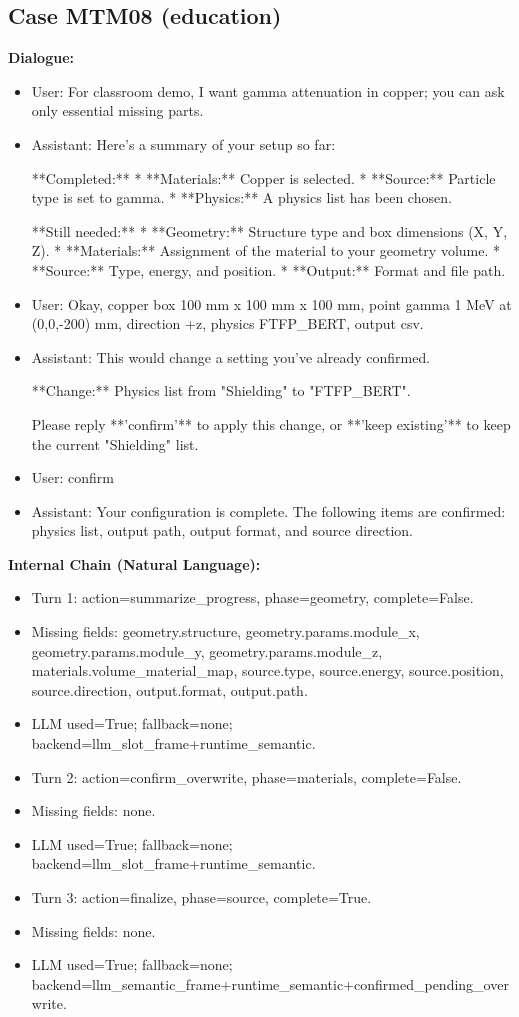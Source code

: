 \documentclass[11pt]{ctexart}
\begin{document}
\subsection{Case MTM08 (education)}
\textbf{Dialogue:}
\begin{itemize}
\item User: For classroom demo, I want gamma attenuation in copper; you can ask only essential missing parts.
\item Assistant: Here's a summary of your setup so far:

**Completed:**
*   **Materials:** Copper is selected.
*   **Source:** Particle type is set to gamma.
*   **Physics:** A physics list has been chosen.

**Still needed:**
*   **Geometry:** Structure type and box dimensions (X, Y, Z).
*   **Materials:** Assignment of the material to your geometry volume.
*   **Source:** Type, energy, and position.
*   **Output:** Format and file path.
\item User: Okay, copper box 100 mm x 100 mm x 100 mm, point gamma 1 MeV at (0,0,-200) mm, direction +z, physics FTFP\_BERT, output csv.
\item Assistant: This would change a setting you've already confirmed.

**Change:** Physics list from "Shielding" to "FTFP\_BERT".

Please reply **'confirm'** to apply this change, or **'keep existing'** to keep the current "Shielding" list.
\item User: confirm
\item Assistant: Your configuration is complete. The following items are confirmed: physics list, output path, output format, and source direction.
\end{itemize}
\textbf{Internal Chain (Natural Language):}
\begin{itemize}
\item Turn 1: action=summarize\_progress, phase=geometry, complete=False.
\item Missing fields: geometry.structure, geometry.params.module\_x, geometry.params.module\_y, geometry.params.module\_z, materials.volume\_material\_map, source.type, source.energy, source.position, source.direction, output.format, output.path.
\item LLM used=True; fallback=none; backend=llm\_slot\_frame+runtime\_semantic.
\item Turn 2: action=confirm\_overwrite, phase=materials, complete=False.
\item Missing fields: none.
\item LLM used=True; fallback=none; backend=llm\_slot\_frame+runtime\_semantic.
\item Turn 3: action=finalize, phase=source, complete=True.
\item Missing fields: none.
\item LLM used=True; fallback=none; backend=llm\_semantic\_frame+runtime\_semantic+confirmed\_pending\_overwrite.
\end{itemize}
\end{document}
